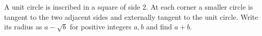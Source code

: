 A unit circle is inscribed in a square of side 2. At each corner a smaller circle is tangent to the two adjacent sides and externally tangent to the unit circle. Write its radius as $a-\sqrt b$ for positive integers $a,b$ and find $a+b$.
